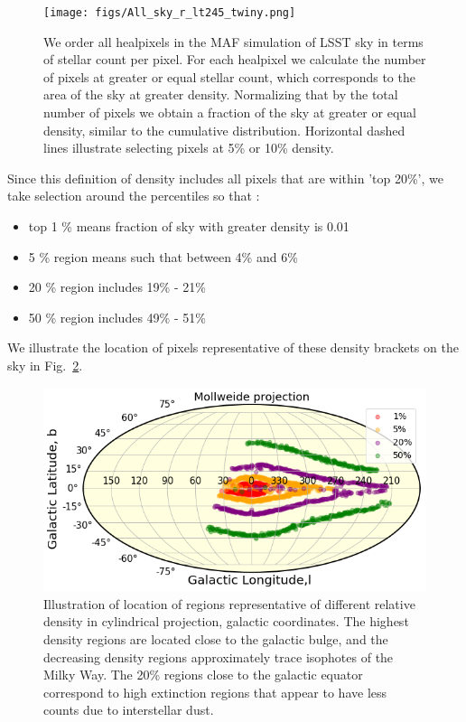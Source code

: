 \documentclass[DM,lsstdraft,toc,usenatbib]{lsstdoc}
\begin{document}
\begin{figure}
\texttt{[image: figs/All\_sky\_r\_lt245\_twiny.png]}
\caption{We order all healpixels in the MAF simulation of LSST sky in terms of stellar count per pixel. For each healpixel we calculate the number of pixels at greater or equal stellar count, which corresponds to the area of the sky at greater density.  Normalizing that by the total number of pixels we obtain a fraction of the sky at greater or equal density, similar to the cumulative distribution. Horizontal dashed lines illustrate selecting pixels at 5\% or 10\% density. }
\label{fig:illustrate_density}
\end{figure} 


Since this definition of density includes all pixels that are within 'top 20\%', we take selection around the percentiles so that :

\begin{itemize}
\item top  1 \%  means  fraction of sky with greater density is 0.01
\item 5 \% region means such that between  4\% and 6\%
\item 20 \% region  includes   19\% - 21\%
\item 50 \% region includes 49\% - 51\% 
\end{itemize}


We illustrate the location of pixels representative of these density brackets on the sky in Fig.~\ref{fig:mollw_galactic}. 


\begin{figure}
\includegraphics[width=1.0\columnwidth]{figs/Illustrate_density_regions_mollw_galactic.png}
\caption{Illustration of location of regions representative of different relative density in cylindrical projection, galactic coordinates. The highest density regions are located close to the galactic bulge, and the decreasing density regions approximately trace isophotes of the Milky Way. The 20\% regions close to the galactic equator correspond to high extinction regions that appear to have less counts due to interstellar dust. }
\label{fig:mollw_galactic}
\end{figure} 
\end{document}
